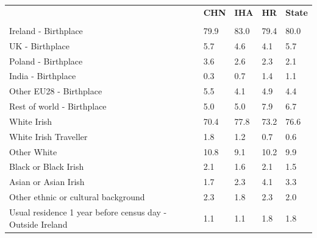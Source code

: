 \documentclass{article}
\begin{document}
\pagebreak
\begin{table}[h]	
\centering
		\begin{tabular}{KTTTT}
  \hline
& \textbf{CHN} & \textbf{IHA} & \textbf{HR}& \textbf{State}\\ 
  \hline
    \\ 
    \hline
Ireland - Birthplace & 79.9& 83.0& 79.4& 80.0\\
UK - Birthplace & 5.7& 4.6& 4.1& 5.7\\
Poland - Birthplace & 3.6& 2.6& 2.3& 2.1\\
India - Birthplace & 0.3& 0.7& 1.4& 1.1\\
Other EU28 - Birthplace & 5.5& 4.1& 4.9& 4.4\\
Rest of world - Birthplace & 5.0& 5.0& 7.9& 6.7\\
    \hline
White Irish & 70.4& 77.8& 73.2& 76.6\\
White Irish Traveller & 1.8& 1.2& 0.7& 0.6\\
Other White & 10.8&  9.1& 10.2&  9.9\\
Black or Black Irish & 2.1& 1.6& 2.1& 1.5\\
Asian or Asian Irish & 1.7& 2.3& 4.1& 3.3\\
Other ethnic or cultural background & 2.3& 1.8& 2.3& 2.0\\
    \hline
Usual residence 1 year before census day - Outside Ireland & 1.1& 1.1& 1.8& 1.8\\


\end{tabular}
\end{table}
\end{document}
